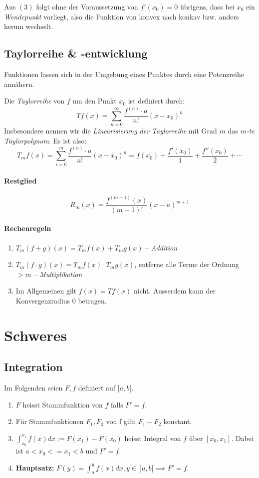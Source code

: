 \documentclass[a4paper, 9pt, DIV=24]{scrartcl}
\begin{document}
Aus $(3)$ folgt ohne der Voraussetzung von $f'(x_0) = 0$ übrigens, dass bei $x_0$ ein \emph{Wendepunkt} vorliegt,
also die Funktion von konvex nach konkav bzw. anders herum wechselt.

\subsection{Taylorreihe \& -entwicklung}
Funktionen lassen sich in der Umgebung eines Punktes durch eine Potenzreihe annähern.

Die \emph{Taylorreihe} von $f$ um den Punkt $x_0$ ist definiert durch:
\[ T f(x) = \sum_{n=0}^{\infty} \dfrac{f^{(n)}\cdot a}{n!}(x-x_0)^n \]
Insbesondere nennen wir die \emph{Linearisierung der Taylorreihe} mit Grad $m$ das \emph{$m$-te Taylorpolynom}.
Es ist also:
\[ T_m f(x) = \sum_{i=0}^{m} \dfrac{f^{(n)}\cdot a}{n!}(x-x_0)^n = f(x_0) + \dfrac{f'(x_0)}{1} + \dfrac{f''(x_0)}{2} + \cdots\]

\paragraph{Restglied}

\[ R_{m}(x) = \frac{f^{(m+1)}(x)}{(m+1)!}(x-a)^{m+1} \]

\paragraph{Rechenregeln}
\begin{enumerate}[label={(}\arabic*{)}]
 \item $T_m(f+g)(x) = T_m f(x) + T_m g(x)$ -- \emph{Addition}
 \item $T_m(f\cdot g)(x) = T_m f(x) \cdot T_m g(x)$, entferne alle Terme der Ordnung $> m$ -- \emph{Multiplikation}
 \item Im Allgemeinen gilt $f(x) = T f(x)$ nicht. Ausserdem kann der Konvergenzradius $0$ betragen.
\end{enumerate}

\clearpage
\section{Schweres}

\subsection{Integration}
Im Folgenden seien $F, f$ definiert auf $]a,b[$.
\begin{enumerate}[label={(}\arabic*{)}]
 \item $F$ heisst Stammfunktion von $f$ falls $F' = f$.
 \item Für Stammfunktionen $F_1, F_2$ von f gilt: $F_1 - F_2$ konstant.
 \item $\int_{x_0}^{x_1}f(x)dx := F(x_1) - F(x_0)$ heisst Integral von $f$ über $[x_0, x_1]$.
   Dabei ist $a < x_0 <= x_1 < b$ und $F' = f$.
 \item \textbf{Hauptsatz:} $F(y) = \int_{a}^{y}f(x)dx, y \in\ ]a,b[ \implies F' = f.$
\end{enumerate}
\end{document}
